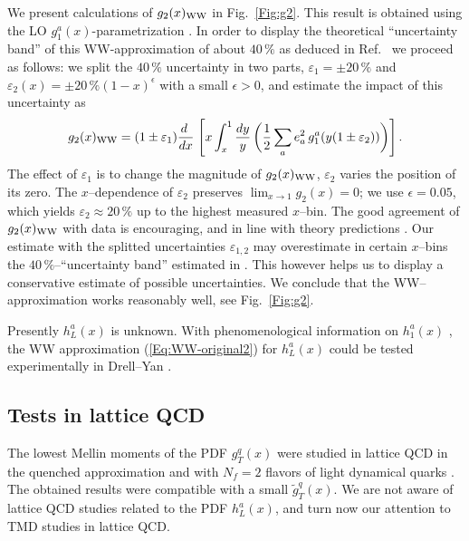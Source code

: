 \documentclass[a4paper,11pt]{article}
\newcommand{\be}{\begin{equation}}
\newcommand{\ee}{\end{equation}}
\begin{document}
We present calculations of $g_2(x)_{\rm WW}$ in Fig.~\ref{Fig:g2}.
This result is obtained using the LO $g_1^a(x)$-parametrization
\cite{Gluck:1998xa}. In order to display the theoretical ``uncertainty
band'' of this WW-approximation of about $40\,\%$ as deduced in
Ref.~\cite{Accardi:2009au} we proceed as follows: we split the
$40\,\%$ uncertainty in two parts, $\varepsilon_1=\pm 20\,\%$ and
$\varepsilon_2(x)=\pm 20\,\%(1-x)^\epsilon$ with a small $\epsilon>0$,
and estimate the impact of this uncertainty as
\be\label{Eq:g2-in-WW-model-violation}
    g_2(x)_{\rm WW} = (1\pm\varepsilon_1)\frac{ d\;}{ d x}\;\Biggl[
    x\int_x^1\frac{ d y}{y} \,\biggl(
    \frac12\sum_ae_a^2\,g_1^a(y(1\pm\varepsilon_2))\biggr)\Biggr]\,.
\ee
The effect of $\varepsilon_1$ is to change the magnitude
of $g_2(x)_{\rm WW}$, $\varepsilon_2$ varies the position of its zero.
The $x$--dependence of $\varepsilon_2$ preserves $\lim_{x\to1}g_2(x)= 0$;
we use $\epsilon=0.05$, which yields $\varepsilon_2\approx 20\,\%$ up to
the highest measured $x$--bin.
The good agreement of $g_2(x)_{\rm WW}$ with data is encouraging,
and in line with theory predictions \cite{Balla:1997hf}.
Our estimate with the splitted uncertainties
$\varepsilon_{1,2}$ may overestimate in certain $x$--bins the
$40\,\%$--``uncertainty band'' estimated in \cite{Accardi:2009au}.
This however helps us to display a conservative estimate of possible
uncertainties.
We conclude that the WW--approximation works reasonably well,
see Fig.~\ref{Fig:g2}.

Presently $h_L^a(x)$ is unknown.
With phenomenological information on $h_1^a(x)$
\cite{Efremov:2006qm,Anselmino:2007fs,Anselmino:2008jk},
the WW approximation (\ref{Eq:WW-original2}) for $h_L^a(x)$ could
be tested experimentally in Drell--Yan \cite{Koike:2008du}.


\subsection{Tests in lattice QCD}
\label{Sec-3.5:WW-lattice}

The lowest Mellin moments of the PDF $g_T^q(x)$ were studied in
lattice QCD in the quenched approximation \cite{Gockeler:2000ja}
and with $N_f = 2$ flavors of light dynamical quarks \cite{Gockeler:2005vw}.
The obtained results were compatible with a small $\tilde{g}_T^q(x)$.
We are not aware of lattice QCD studies related to the PDF $h_L^a(x)$,
and turn now our attention to TMD studies in lattice QCD.
\end{document}
